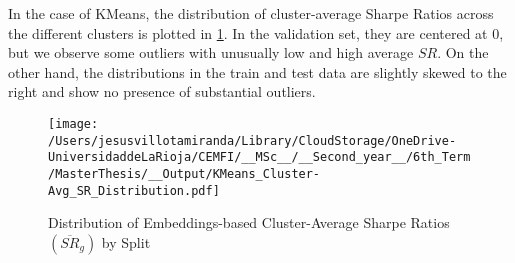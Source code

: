 %
%
%
%

In the case of KMeans, the distribution of cluster-average Sharpe Ratios across the different clusters is plotted in \cref{fig:KMeans_distr_avg_SR}. In the validation set, they are centered at 0, but we observe some outliers with unusually low and high average $SR$. On the other hand, the distributions in the train and test data are slightly skewed to the right and show no presence of substantial outliers.

\begin{figure}[H]
  \centering
  \caption{Distribution of Embeddings-based Cluster-Average Sharpe Ratios $(\overline{SR}_g)$ by Split}
  \texttt{[image: /Users/jesusvillotamiranda/Library/CloudStorage/OneDrive-UniversidaddeLaRioja/CEMFI/\_\_MSc\_\_/\_\_Second\_year\_\_/6th\_Term/MasterThesis/\_\_Output/KMeans\_Cluster-Avg\_SR\_Distribution.pdf]}
\label{fig:KMeans_distr_avg_SR}

\end{figure}


